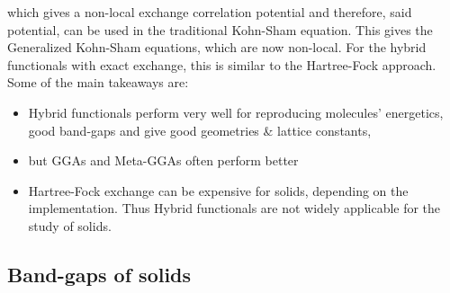 \documentclass{homework}
\begin{document}
which gives a non-local exchange correlation potential and therefore, said potential, can be used in the traditional Kohn-Sham equation. This gives the Generalized Kohn-Sham equations, which are now non-local. For the hybrid functionals with exact exchange, this is similar to the Hartree-Fock approach. \\

Some of the main takeaways are: 

\begin{itemize}
    \item Hybrid functionals perform very well for reproducing molecules' energetics, good band-gaps and give good geometries \& lattice constants, 
    \item but GGAs and Meta-GGAs often perform better
    \item Hartree-Fock exchange can be expensive for solids, depending on the implementation. Thus Hybrid functionals are not widely applicable for the study of solids. 
\end{itemize}

\subsection{Band-gaps of solids}
\end{document}
